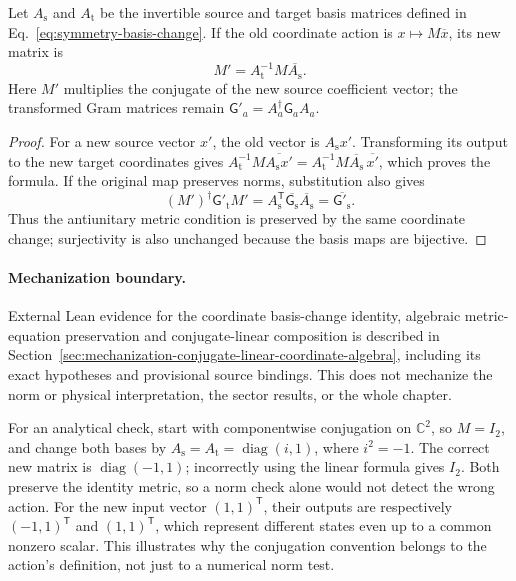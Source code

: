 \begin{lemma}
\label{lem:symmetry-antiunitary-basis-change}
Let $A_{\mathrm s}$ and $A_{\mathrm t}$ be the invertible source and target
basis matrices defined in Eq.~\eqref{eq:symmetry-basis-change}. If the old
coordinate action is $x\mapsto M\overline x$, its new matrix is
\begin{equation}
  M'=A_{\mathrm t}^{-1}M\overline{A_{\mathrm s}}.
  \label{eq:symmetry-antiunitary-basis-change}
\end{equation}
Here $M'$ multiplies the conjugate of the new source coefficient vector;
the transformed Gram matrices remain
$\mathsf G'_a=A_a^{\dagger}\mathsf G_a A_a$.
\end{lemma}
\begin{proof}
For a new source vector $x'$, the old vector is $A_{\mathrm s}x'$.
Transforming its output to the new target coordinates gives
$A_{\mathrm t}^{-1}M\overline{A_{\mathrm s}x'}
=A_{\mathrm t}^{-1}M\overline{A_{\mathrm s}}\,\overline{x'}$,
which proves the formula. If the original map preserves norms, substitution
also gives
\begin{equation}
  (M')^{\dagger}\mathsf G'_{\mathrm t}M'
  =A_{\mathrm s}^{\mathsf T}\overline{\mathsf G_{\mathrm s}}
      \overline{A_{\mathrm s}}
  =\overline{\mathsf G'_{\mathrm s}}.
  \label{eq:symmetry-antiunitary-metric-basis-change}
\end{equation}
Thus the antiunitary metric condition is preserved by the same coordinate
change; surjectivity is also unchanged because the basis maps are bijective.
\end{proof}

\paragraph{Mechanization boundary.}
External Lean evidence for the coordinate basis-change identity, algebraic
metric-equation preservation and conjugate-linear composition is described in
Section~\ref{sec:mechanization-conjugate-linear-coordinate-algebra}, including
its exact hypotheses and provisional source bindings. This does not mechanize
the norm or physical interpretation, the sector results, or the whole chapter.

For an analytical check, start with componentwise conjugation on $\mathbb C^2$,
so $M=I_2$, and change both bases by
$A_{\mathrm s}=A_{\mathrm t}=\operatorname{diag}(i,1)$, where $i^2=-1$.
The correct new matrix is $\operatorname{diag}(-1,1)$; incorrectly using the
linear formula gives $I_2$. Both preserve the identity metric, so a norm
check alone would not detect the wrong action. For the new input vector
$(1,1)^{\mathsf T}$, their outputs are respectively $(-1,1)^{\mathsf T}$
and $(1,1)^{\mathsf T}$, which represent different states even up to a common
nonzero scalar. This illustrates why the conjugation convention belongs to
the action's definition, not just to a numerical norm test.

